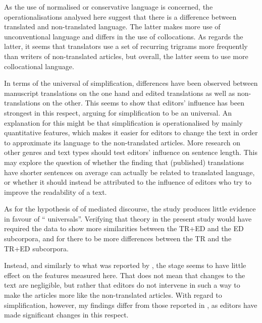 \documentclass[output=paper]{LSP/langsci}
\begin{document}
As the use of normalised or conservative language is concerned, the operationalisations analysed here suggest that there is a difference between translated and non-translated language. The latter makes more use of unconventional language and differs in the use of collocations. As regards the latter, it seems that translators use a set of recurring trigrams more frequently than writers of non-translated articles, but overall, the latter seem to use more collocational language.

In terms of the universal of simplification, differences have been observed between manuscript translations on the one hand and edited translations as well as non-translations on the other. This seems to show that editors' influence has been strongest in this respect, arguing for simplification to be an  universal. An explanation for this might be that simplification is operationalised by mainly quantitative features, which makes it easier for editors to change the text in order to approximate its language to the non-translated articles. More research on other genres and text types should test editors' influence on sentence length. This may explore the question of whether the finding that (published) translations have shorter sentences on average can actually be related to translated language, or whether it should instead be attributed to the influence of editors who try to improve the readability of a text.

As for the hypothesis of  of mediated discourse, the study produces little evidence in favour of \enquote{ universals}. Verifying that theory in the present study would have required the data to show more similarities between the TR+ED and the ED subcorpora, and for there to be more differences between the TR and the TR+ED subcorpora.

Instead, and similarly to what was reported by \textcite{kruger12}, the  stage seems to have little effect on the features measured here. That does not mean that changes to the text are negligible, but rather that editors do not intervene in such a way to make the articles more like the non-translated articles. With regard to simplification, however, my findings differ from those reported in \textcite{kruger12}, as editors have made significant changes in this respect.
\end{document}
